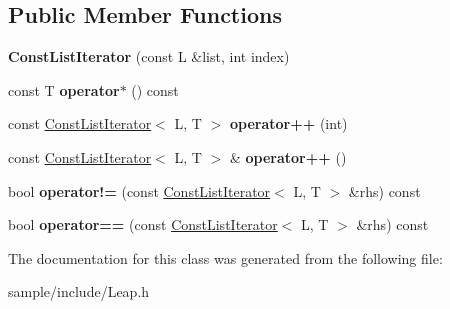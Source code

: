 \subsection*{Public Member Functions}
\begin{DoxyCompactItemize}
\item 
\mbox{\label{class_leap_1_1_const_list_iterator_a2e2ea42a7871e007fe3f2aeec21f2124}} 
{\bfseries Const\+List\+Iterator} (const L \&list, int index)
\item 
\mbox{\label{class_leap_1_1_const_list_iterator_aae28b80aa1ab0cd68a8b1e25342af281}} 
const T {\bfseries operator$\ast$} () const
\item 
\mbox{\label{class_leap_1_1_const_list_iterator_afa92cefaa3b094d75dd8383415f47126}} 
const \hyperlink{class_leap_1_1_const_list_iterator}{Const\+List\+Iterator}$<$ L, T $>$ {\bfseries operator++} (int)
\item 
\mbox{\label{class_leap_1_1_const_list_iterator_af58c4e944c5a9b5718a0194f6f5c220f}} 
const \hyperlink{class_leap_1_1_const_list_iterator}{Const\+List\+Iterator}$<$ L, T $>$ \& {\bfseries operator++} ()
\item 
\mbox{\label{class_leap_1_1_const_list_iterator_a1ae30f8105d24caaae4ca717f2df098c}} 
bool {\bfseries operator!=} (const \hyperlink{class_leap_1_1_const_list_iterator}{Const\+List\+Iterator}$<$ L, T $>$ \&rhs) const
\item 
\mbox{\label{class_leap_1_1_const_list_iterator_a9d11d18ed3cdfd5724d03c43cfb8cb84}} 
bool {\bfseries operator==} (const \hyperlink{class_leap_1_1_const_list_iterator}{Const\+List\+Iterator}$<$ L, T $>$ \&rhs) const
\end{DoxyCompactItemize}


The documentation for this class was generated from the following file\+:\begin{DoxyCompactItemize}
\item 
sample/include/Leap.\+h\end{DoxyCompactItemize}
